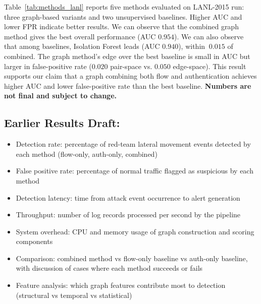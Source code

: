 \documentclass[letterpaper,twocolumn,10pt]{article}
\begin{document}
\label{sec:baselines_lanl}
Table~\ref{tab:methods_lanl} reports five methods evaluated on LANL-2015 run: three graph-based variants and two unsupervised baselines. Higher AUC and lower FPR indicate better results. We can observe that the combined graph method gives the best overall performance (AUC $0.954$). We can also observe that among baselines, Isolation Forest leads (AUC $0.940$), within $~0.015$ of combined. The graph method's edge over the best baseline is small in AUC but larger in false-positive rate ($0.020$ pair-space vs. $0.050$ edge-space). This result supports our claim that a graph combining both flow and authentication achieves higher AUC and lower false-positive rate than the best baseline. \textbf{Numbers are not final and subject to change.}

\subsection{Earlier Results Draft:}
\begin{itemize}
\item Detection rate: percentage of red-team lateral movement events detected by each method (flow-only, auth-only, combined)
\item False positive rate: percentage of normal traffic flagged as suspicious by each method
\item Detection latency: time from attack event occurrence to alert generation
\item Throughput: number of log records processed per second by the pipeline
\item System overhead: CPU and memory usage of graph construction and scoring components
\item Comparison: combined method vs flow-only baseline vs auth-only baseline, with discussion of cases where each method succeeds or fails
\item Feature analysis: which graph features contribute most to detection (structural vs temporal vs statistical)
\end{itemize}
\end{document}
